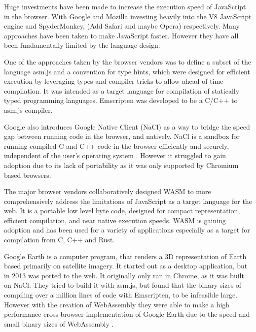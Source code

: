 \documentclass[11pt]{book}
\begin{document}
Huge investments have been made to increase the execution speed of JavaScript in the browser. With Google and Mozilla investing heavily into the V8 JavaScript engine and SpyderMonkey, (Add Safari and maybe Opera) respectively. Many approaches have been taken to make JavaScript faster. However they have all been fundamentally limited by the language design. 


One of the approaches taken by the browser vendors was to define a subset of the language asm.js and a convention for type hints, which were designed for efficient execution by leveraging types and compiler tricks to allow ahead of time compilation. It was intended as a target language for compilation of statically typed programming languages. Emscripten \cite{emcc} was developed to be a C/C++ to asm.js compiler. 

Google also introduces Google Native Client (NaCl)\cite{nacl} as a way to bridge the speed gap between running code in the browser, and natively. NaCl is a sandbox for running compiled C and C++ code in the browser efficiently and securely, independent of the user’s operating system \cite{nacl}. However it struggled to gain adoption due to its lack of portability as it was only supported by Chromium based browsers. 


The major browser vendors collaboratively designed WASM \cite{wasm_og} to more comprehensively address the limitations of JavaScript as a target language for the web. It is a portable low level byte code, designed for compact representation, efficient compilation, and near native execution speeds. WASM is gaining adoption and has been used for a variety of applications especially as a target for compilation from C, C++ and Rust. 

Google Earth\cite{google-earth-history} is a computer program, that renders a 3D representation of Earth based primarily on satellite imagery. It started out as a desktop application, but in 2013 was ported to the web. It originally only ran in Chrome, as it was built on NaCl. They tried to build it with asm.js, but found that the binary sizes of compiling over a million lines of code with Emscripten, to be infeasible large. However with the creation of WebAssembly they were able to make a high performance cross browser implementation of Google Earth due to the speed and small binary sizes of WebAssembly \cite{google-earth}.
\end{document}
